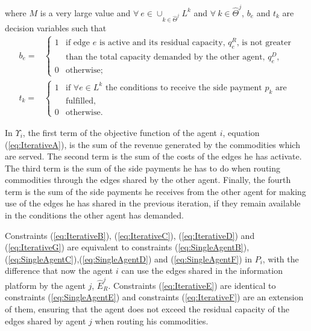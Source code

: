 \documentclass{article}
\begin{document}
where $M$ is a very large value  and $\forall\ e \in \cup_{k\in\widehat{\Theta}^j}L^k$ and $\forall\ k\in \widehat{\Theta}^j$, $b_e$ and $t_k$ are decision variables such that
\[
\begin{array}{rl}
b_e = & \begin{cases}
    1 & \text{if edge } e \text{ is active and its residual capacity, } q_e^R\text{, is not greater} \\[-2pt]
    & \text{than the total capacity demanded by the other agent, } q_e^D,\\
    0 & \text{otherwise;}
\end{cases}  \\[20pt]
t_k = &\begin{cases}
    1 & \text{if } \forall e \in L^k \text{ the conditions to receive the side payment } p_k \text{ are} \\[-2pt]
    & \text{fulfilled},\\
    0 & \text{otherwise.}    
\end{cases}
\end{array}
\]

In $\Upsilon_i$, the first term of the objective function of the agent $i$, equation (\ref{eq:IterativeA}), is the sum of the revenue generated by the commodities which are served. The second term is the sum of the costs of the edges he has activate. The third term is the sum of the side payments he has to do when routing commodities through the edges shared by the other agent. Finally, the fourth term is the sum of the side payments he receives from the other agent for making use of the edges he has shared in the previous iteration, if they remain available in the conditions the other agent has demanded.

Constraints (\ref{eq:IterativeB}), (\ref{eq:IterativeC}), (\ref{eq:IterativeD}) and (\ref{eq:IterativeG}) are equivalent to constraints (\ref{eq:SingleAgentB}),(\ref{eq:SingleAgentC}),(\ref{eq:SingleAgentD}) and (\ref{eq:SingleAgentF}) in $P_i$, with the difference that now the agent $i$ can use the edges shared in the information platform by the agent $j$, $\widehat{E}_R^j$. Constraints (\ref{eq:IterativeE}) are identical to constraints (\ref{eq:SingleAgentE}) and constraints (\ref{eq:IterativeF}) are an extension of them, ensuring that the agent does not exceed the residual capacity of the edges shared by agent $j$ when routing his commodities.
\end{document}
